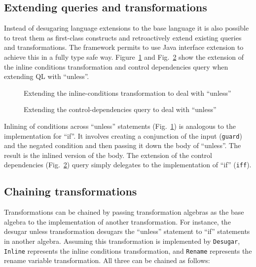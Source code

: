 \subsection{Extending queries and transformations}

Instead of desugaring language extensions to the base language it is also possible to treat them as first-class constructs and retroactively extend existing queries and transformations.
The framework permits to use  Java interface extension to achieve this in a fully type safe way.
Figure~\ref{inline_conds_unless} and Fig.~\ref{controldeps_unless} show the extension of the inline conditions transformation and control dependencies query when extending QL with ``unless''.

\begin{figure}[tb]
\vspace{-.1in}
\caption{Extending the inline-conditions transformation to deal with ``unless''}
\label{inline_conds_unless}
\end{figure}

\begin{figure}[tb]
\vspace{-.1in}
\caption{Extending the control-dependencies query to deal with ``unless''}
\label{controldeps_unless}
\end{figure}

Inlining of conditions across ``unless'' statements (Fig.~\ref{inline_conds_unless}) is analogous to the implementation for ``if''.
It involves creating a conjunction of the input (\lstinline{guard}) and the negated condition and then passing it down the body of ``unless''. The result is the inlined version of the body.
The extension of the control dependencies (Fig.~\ref{controldeps_unless}) query simply delegates to the implementation of ``if'' (\lstinline{iff}). 

\subsection{Chaining transformations}

Transformations can be chained by passing transformation algebras as the base algebra to the implementation of another transformation.
For instance, the desugar unless transformation desugars the ``unless'' statement to ``if'' statements in another algebra.
Assuming this transformation is implemented by \lstinline{Desugar},  \lstinline{Inline} represents the inline conditions transformation, and \lstinline{Rename} represents the rename variable transformation. All three can be chained as follows:

